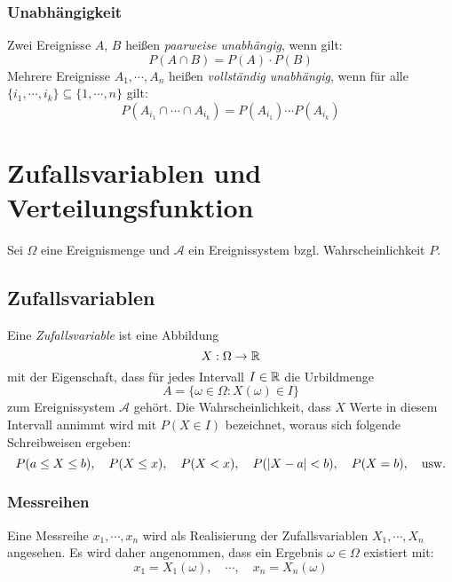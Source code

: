             \subsubsection{Unabhängigkeit}
                Zwei Ereignisse \(A\), \(B\) heißen \textit{paarweise unabhängig}, wenn gilt:
                \begin{equation*}
                    P(A \cap B) = P(A) \cdot P(B)
                \end{equation*}
                Mehrere Ereignisse \( A_1, \cdots, A_n \) heißen \textit{vollständig unabhängig}, wenn für alle \( \{ i_1, \cdots, i_k \} \subseteq \{ 1, \cdots, n \} \) gilt:
                \begin{equation*}
                    P(A_{i_1} \cap \cdots \cap A_{i_k}) = P(A_{i_1}) \cdots P(A_{i_k})
                \end{equation*}
                

    \section{Zufallsvariablen und Verteilungsfunktion}
        Sei \( \Omega \) eine Ereignismenge und \( \mathcal{A} \) ein Ereignissystem bzgl. Wahrscheinlichkeit \(P\).
    
        \subsection{Zufallsvariablen} %
            Eine \textit{Zufallsvariable} ist eine Abbildung \[ X : \Omega \rightarrow \mathbb{R} \] mit der Eigenschaft, dass für jedes Intervall \( I \in \mathbb{R} \) die Urbildmenge \[ A = \{ \omega \in \Omega : X(\omega) \in I \} \] zum Ereignissystem \(\mathcal{A}\) gehört. Die Wahrscheinlichkeit, dass \(X\) Werte in diesem Intervall annimmt wird mit \( P(X \in I) \) bezeichnet, woraus sich folgende Schreibweisen ergeben:
            \begin{equation*}
                P(a \leq X \leq b), \quad P(X \leq x), \quad P(X < x), \quad P(\abs{X - a} < b), \quad P(X = b), \quad \textrm{usw.}
            \end{equation*}

            \subsubsection{Messreihen}
                Eine Messreihe \( x_1, \cdots, x_n \) wird als Realisierung der Zufallsvariablen \( X_1, \cdots, X_n \) angesehen. Es wird daher angenommen, dass ein Ergebnis \( \omega \in \Omega \) existiert mit:
                \begin{equation*}
                    x_1 = X_1(\omega), \quad \cdots, \quad x_n = X_n(\omega)
                \end{equation*}

